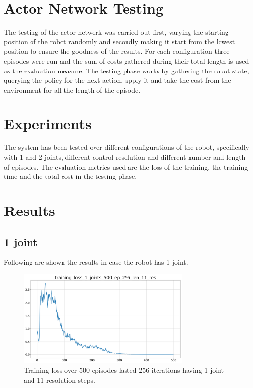 \documentclass[twocolumn, a4paper]{article}
\begin{document}
\section{Actor Network Testing}
The testing of the actor network was carried out first, varying the starting
position of the robot randomly and secondly making it start from the lowest
position to ensure the goodness of the results.
For each configuration three episodes were run and the sum of costs gathered
during their total length is used as the evaluation measure.
The testing phase works by gathering the robot state, querying the policy
for the next action, apply it and take the cost from the environment for all
the length of the episode.

\section{Experiments}
The system has been tested over different configurations of the robot,
specifically with 1 and 2 joints, different control resolution and
different number and length of episodes.
The evaluation metrics used are the loss of the training, the training time
and the total cost in the testing phase.

\section{Results}
\subsection{1 joint}
Following are shown the results in case the robot has 1 joint.

\begin{figure}[H]
	\centering
	\includegraphics[width=8.5cm]{"../Figures/training_loss_1J_500E_256EL_11RES.png"}
	\caption{Training loss over 500 episodes lasted 256 iterations having 1
			 joint and 11 resolution steps.}
	\label{fig:TrainLoss_1_500_11}
\end{figure}
\end{document}
